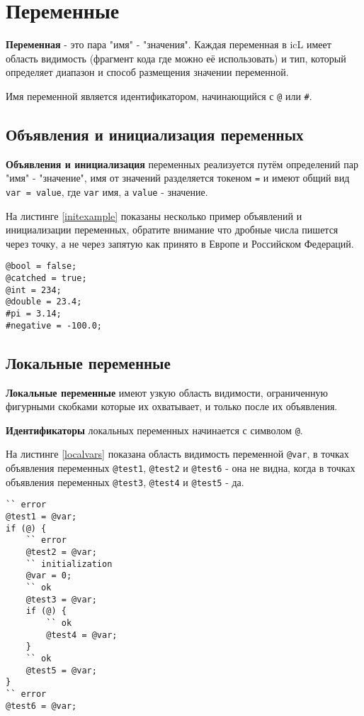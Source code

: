 \section{Переменные}

\textbf{Переменная} - это пара "имя" - "значения". Каждая переменная в icL имеет область видимость (фрагмент кода где можно её использовать) и тип, который определяет диапазон и способ размещения значении переменной.

Имя переменной является идентификатором, начинающийся с \lstinline|@| или {\color{blue2}\lstinline|#|}.

\subsection{Объявления и инициализация переменных}

\textbf{Объявления и инициализация} переменных реализуется путём определений пар "имя" - "значение", имя от значений разделяется токеном \lstinline|=| и имеют общий вид \lstinline|var = value|, где \lstinline|var| имя, а \lstinline|value| - значение.

На листинге \ref{initexample} показаны несколько пример объявлений и инициализации переменных, обратите внимание что дробные числа пишется через точку, а не через запятую как принято в Европе и Российском Федераций.

\begin{lstlisting}[caption=Пример объявлений и инициализации переменных,label=initexample]
@bool = false;
@catched = true;
@int = 234;
@double = 23.4;
#pi = 3.14;
#negative = -100.0;
\end{lstlisting}

\subsection{Локальные переменные}

\textbf{Локальные переменные} имеют узкую область видимости, ограниченную фигурными скобками которые их охватывает, и только после их объявления.

{\bf Идентификаторы} локальных переменных начинается с символом \lstinline|@|.

На листинге \ref{localvars} показана область видимость переменной \lstinline|@var|, в точках объявления переменных \lstinline|@test1|, \lstinline|@test2| и \lstinline|@test6| - она не видна, когда в точках объявления переменных \lstinline|@test3|, \lstinline|@test4| и \lstinline|@test5| - да.
\begin{lstlisting}[caption=Область видимости локальных перемен, label=localvars]
`` error
@test1 = @var;
if (@) {
	`` error
	@test2 = @var;
	`` initialization
	@var = 0;
	`` ok
	@test3 = @var;
	if (@) {
		`` ok
		@test4 = @var;
	}
	`` ok
	@test5 = @var;
}
`` error
@test6 = @var;
\end{lstlisting}

